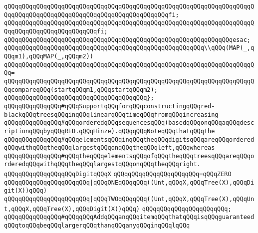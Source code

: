 \verb|qQQqqQQqqQQqqQQqqQQqqQQqqQQqqQQqqQQqqQQqqQQqqQQqqQQqqQQqqQQqqQQqqQQqqQQqqQQqqQQqqQQqqQQqqQQqqQQqqQQqqQQqqQQqqQQqqQQqfi;|\newline
\verb|qQQqqQQqqQQqqQQqqQQqqQQqqQQqqQQqqQQqqQQqqQQqqQQqqQQqqQQqqQQqqQQqqQQqqQQqqQQqqQQqqQQqqQQqqQQqqQQqfi;|\newline
\verb|qQQqqQQqqQQqqQQqqQQqqQQqqQQqqQQqqQQqqQQqqQQqqQQqqQQqqQQqqQQqqQQqesac;|\newline
\newline
\verb|qQQqqQQqqQQqqQQqqQQqqQQqqQQqqQQqqQQqqQQqqQQqqQQqqQQqqQQq\\qQQq(MAP(_,qQQqm1),qQQqMAP(_,qQQqm2))|\newline
\verb|qQQqqQQqqQQqqQQqqQQqqQQqqQQqqQQqqQQqqQQqqQQqqQQqqQQqqQQqqQQqqQQqqQQqqQQq=|\newline
\verb|qQQqqQQqqQQqqQQqqQQqqQQqqQQqqQQqqQQqqQQqqQQqqQQqqQQqqQQqqQQqqQQqqQQqqQQqcompareqQQq(startqQQqm1,qQQqstartqQQqm2);|\newline
\verb|qQQqqQQqqQQqqQQqqQQqqQQqqQQqqQQqqQQqqQQq};|\newline
\newline
\verb|qQQqqQQqqQQqqQQq#qQQqSupportqQQqforqQQqconstructingqQQqred-blackqQQqtreesqQQqinqQQqlinearqQQqtimeqQQqfromqQQqincreasing|\newline
\verb|qQQqqQQqqQQqqQQq#qQQqorderedqQQqsequencesqQQq(basedqQQqonqQQqaqQQqdescriptionqQQqbyqQQqRED.qQQqHinze).qQQqqQQqNoteqQQqthatqQQqthe|\newline
\verb|qQQqqQQqqQQqqQQq#qQQqelementsqQQqinqQQqtheqQQqdigitsqQQqareqQQqorderedqQQqwithqQQqtheqQQqlargestqQQqonqQQqtheqQQqleft,qQQqwhereas|\newline
\verb|qQQqqQQqqQQqqQQq#qQQqtheqQQqelementsqQQqofqQQqtheqQQqtreesqQQqareqQQqorderedqQQqwithqQQqtheqQQqlargestqQQqonqQQqtheqQQqright.|\newline
\newline
\verb|qQQqqQQqqQQqqQQqqQQqDigitqQQqX|\newline
\verb|qQQqqQQqqQQqqQQqqQQqqQQq=qQQqZERO|\newline
\verb|qQQqqQQqqQQqqQQqqQQqqQQq|\verb#|qQQqONEqQQqqQQq((Unt,qQQqX,qQQqTree(X),qQQqDigit(X))qQQq)#\newline
\verb|qQQqqQQqqQQqqQQqqQQqqQQq|\verb#|qQQqTWOqQQqqQQq((Unt,qQQqX,qQQqTree(X),qQQqUnt,qQQqX,qQQqTree(X),qQQqDigit(X))qQQq)#\newline
\verb|qQQqqQQqqQQqqQQqqQQqqQQq;|\newline
\newline
\newline
\verb|qQQqqQQqqQQqqQQq#qQQqqQQqAddqQQqanqQQqitemqQQqthatqQQqisqQQqguaranteedqQQqtoqQQqbeqQQqlargerqQQqthanqQQqanyqQQqinqQQqlqQQq|\newline
